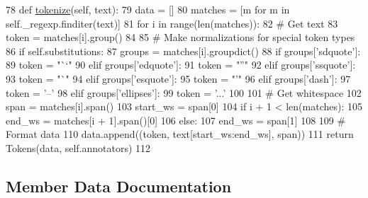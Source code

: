 \begin{DoxyCode}
78     \textcolor{keyword}{def }\hyperlink{namespaceparlai_1_1agents_1_1tfidf__retriever_1_1build__tfidf_a1fdb457e98eb4e4c26047e229686a616}{tokenize}(self, text):
79         data = []
80         matches = [m \textcolor{keywordflow}{for} m \textcolor{keywordflow}{in} self.\_regexp.finditer(text)]
81         \textcolor{keywordflow}{for} i \textcolor{keywordflow}{in} range(len(matches)):
82             \textcolor{comment}{# Get text}
83             token = matches[i].group()
84 
85             \textcolor{comment}{# Make normalizations for special token types}
86             \textcolor{keywordflow}{if} self.substitutions:
87                 groups = matches[i].groupdict()
88                 \textcolor{keywordflow}{if} groups[\textcolor{stringliteral}{'sdquote'}]:
89                     token = \textcolor{stringliteral}{"``"}
90                 \textcolor{keywordflow}{elif} groups[\textcolor{stringliteral}{'edquote'}]:
91                     token = \textcolor{stringliteral}{"''"}
92                 \textcolor{keywordflow}{elif} groups[\textcolor{stringliteral}{'ssquote'}]:
93                     token = \textcolor{stringliteral}{"`"}
94                 \textcolor{keywordflow}{elif} groups[\textcolor{stringliteral}{'esquote'}]:
95                     token = \textcolor{stringliteral}{"'"}
96                 \textcolor{keywordflow}{elif} groups[\textcolor{stringliteral}{'dash'}]:
97                     token = \textcolor{stringliteral}{'--'}
98                 \textcolor{keywordflow}{elif} groups[\textcolor{stringliteral}{'ellipses'}]:
99                     token = \textcolor{stringliteral}{'...'}
100 
101             \textcolor{comment}{# Get whitespace}
102             span = matches[i].span()
103             start\_ws = span[0]
104             \textcolor{keywordflow}{if} i + 1 < len(matches):
105                 end\_ws = matches[i + 1].span()[0]
106             \textcolor{keywordflow}{else}:
107                 end\_ws = span[1]
108 
109             \textcolor{comment}{# Format data}
110             data.append((token, text[start\_ws:end\_ws], span))
111         \textcolor{keywordflow}{return} Tokens(data, self.annotators)
112 \end{DoxyCode}


\subsection{Member Data Documentation}
\mbox{\label{classparlai_1_1agents_1_1tfidf__retriever_1_1tokenizers_1_1regexp__tokenizer_1_1RegexpTokenizer_a65cb61d1c0083a7ac246eb65740f44a0}} 
